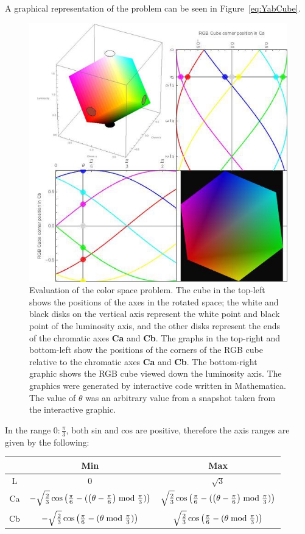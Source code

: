 A graphical representation of the problem can be seen in Figure~\ref{eq:YabCube}.

\begin{figure}[h!]
  \centering
    \includegraphics[width=\textwidth]{Chapter2/Figs/CornersOf_theRGBCube.jpg}
    \caption{Evaluation of the color space problem. The cube in the top-left shows the positions of the axes in the rotated space; the white and black disks on the vertical axis represent the white point and black point of the luminosity axis, and the other disks represent the ends of the chromatic axes \textbf{Ca} and \textbf{Cb}. The graphs in the top-right and bottom-left show the positions of the corners of the RGB cube relative to the chromatic axes \textbf{Ca} and \textbf{Cb}. The bottom-right graphic shows the RGB cube viewed down the luminosity axis. The graphics were generated by interactive code written in Mathematica. The value of $\theta$ was an arbitrary value from a snapshot taken from the interactive graphic.}\label{fig:YABCubeEval}
\end{figure}

In the range $0:\frac{\pi}{3}$, both sin and cos are positive, therefore the axis ranges are given by the following:

\begin{tabular}{|c|c|c|}
  \hline
    & Min & Max \\ \hline
  L & \(0\) & \(\sqrt{3}\) \\
  Ca & \(- \sqrt{\frac{2}{3}} \cos \left(\frac{\pi}{6}-(\left(\theta -\frac{\pi}{6}\right) \bmod \frac{\pi }{3})\right) \)&\( \sqrt{\frac{2}{3}} \cos \left(\frac{\pi}{6}-(\left(\theta -\frac{\pi}{6}\right) \bmod \frac{\pi }{3})\right) \)\\
 Cb & \(-\sqrt{\frac{2}{3}} \cos \left(\frac{\pi}{6}-(\theta  \bmod \frac{\pi }{3})\right) \)&\( \sqrt{\frac{2}{3}} \cos \left(\frac{\pi}{6}-(\theta  \bmod \frac{\pi }{3})\right) \)\\
  \hline
\end{tabular}

